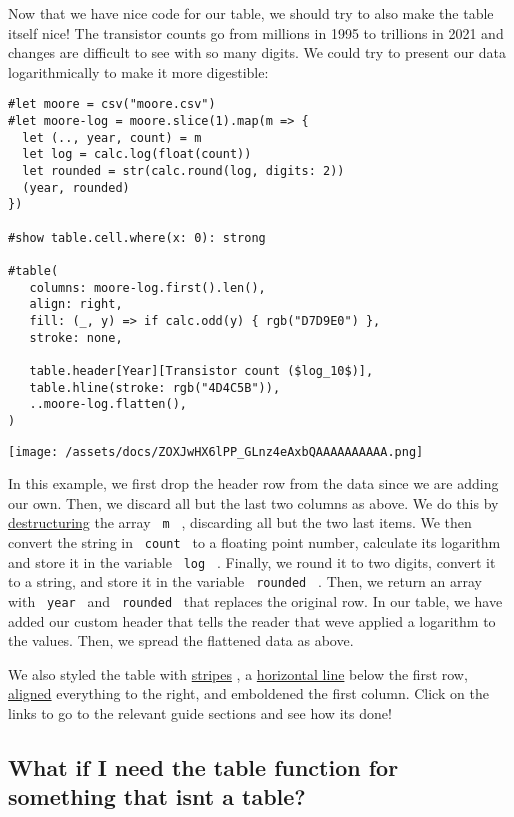 Now that we have nice code for our table, we should try to also make the
table itself nice! The transistor counts go from millions in 1995 to
trillions in 2021 and changes are difficult to see with so many digits.
We could try to present our data logarithmically to make it more
digestible:

\begin{verbatim}
#let moore = csv("moore.csv")
#let moore-log = moore.slice(1).map(m => {
  let (.., year, count) = m
  let log = calc.log(float(count))
  let rounded = str(calc.round(log, digits: 2))
  (year, rounded)
})

#show table.cell.where(x: 0): strong

#table(
   columns: moore-log.first().len(),
   align: right,
   fill: (_, y) => if calc.odd(y) { rgb("D7D9E0") },
   stroke: none,

   table.header[Year][Transistor count ($log_10$)],
   table.hline(stroke: rgb("4D4C5B")),
   ..moore-log.flatten(),
)
\end{verbatim}

\texttt{[image: /assets/docs/ZOXJwHX6lPP\_GLnz4eAxbQAAAAAAAAAA.png]}

In this example, we first drop the header row from the data since we are
adding our own. Then, we discard all but the last two columns as above.
We do this by \href{/docs/reference/scripting/\#bindings}{destructuring}
the array \texttt{\ m\ } , discarding all but the two last items. We
then convert the string in \texttt{\ count\ } to a floating point
number, calculate its logarithm and store it in the variable
\texttt{\ log\ } . Finally, we round it to two digits, convert it to a
string, and store it in the variable \texttt{\ rounded\ } . Then, we
return an array with \texttt{\ year\ } and \texttt{\ rounded\ } that
replaces the original row. In our table, we have added our custom header
that tells the reader that we\textquotesingle ve applied a logarithm to
the values. Then, we spread the flattened data as above.

We also styled the table with \hyperref[fills]{stripes} , a
\hyperref[individual-lines]{horizontal line} below the first row,
\hyperref[alignment]{aligned} everything to the right, and emboldened
the first column. Click on the links to go to the relevant guide
sections and see how it\textquotesingle s done!

\subsection{What if I need the table function for something that
isn\textquotesingle t a table?}\label{table-and-grid}

